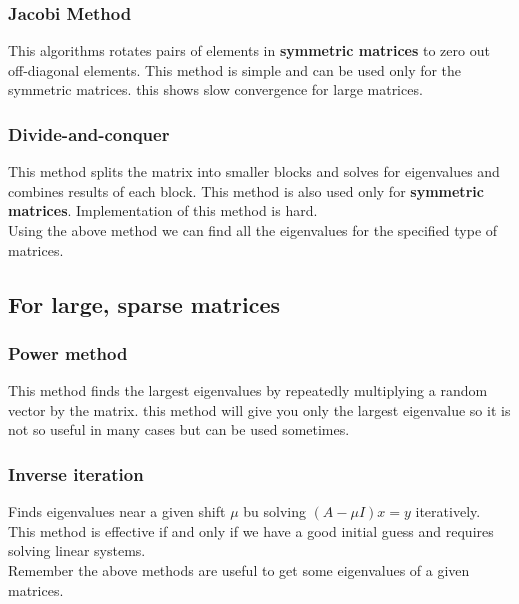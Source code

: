 \documentclass[a4paper,12pt]{article}
\begin{document}
\subsubsection{Jacobi Method}
This algorithms rotates pairs of elements in \textbf{symmetric matrices} to zero out off-diagonal elements. This method is simple and can be used only for the symmetric matrices. this shows slow convergence for large matrices. 
\subsubsection{Divide-and-conquer}
This method splits the matrix into smaller blocks and solves for eigenvalues and combines results of each block. This method is also used only for \textbf{symmetric matrices}. Implementation of this method is hard.\\

Using the above method we can find all the eigenvalues for the specified type of matrices.
\subsection{For large, sparse matrices}
\subsubsection{Power method}
This method finds the largest eigenvalues by repeatedly multiplying a random vector by the matrix. this method will give you only the largest eigenvalue so it is not so useful in many cases but can be used sometimes. 
\subsubsection{Inverse iteration}
Finds eigenvalues near a given shift $\mu$ bu solving $(A-\mu I)x=y$ iteratively. This method is effective if and only if we have a good initial guess and requires solving linear systems.\\

Remember the above methods are useful to get some eigenvalues of a given matrices.
\end{document}

